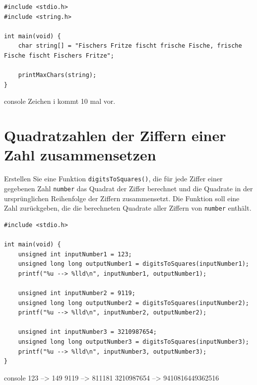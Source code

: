 \Vorlage
\begin{verbatim}
#include <stdio.h>
#include <string.h>

int main(void) {
    char string[] = "Fischers Fritze fischt frische Fische, frische Fische fischt Fischers Fritze";

    printMaxChars(string);
}
\end{verbatim}

\begin{mybox}[Bildschirmausgabe]{console}
Zeichen i kommt 10 mal vor.
\end{mybox}





\chapter{Quadratzahlen der Ziffern einer Zahl zusammensetzen}

\vspace{10pt}

Erstellen Sie eine Funktion \texttt{digitsToSquares()}, die für jede
Ziffer einer gegebenen Zahl \texttt{number} das Quadrat der Ziffer
berechnet und die Quadrate in der ursprünglichen Reihenfolge der Ziffern
zusammensetzt. Die Funktion soll eine Zahl zurückgeben, die die berechneten
Quadrate aller Ziffern von \texttt{number} enthält.

\Vorlage
\begin{verbatim}
#include <stdio.h>

int main(void) {
    unsigned int inputNumber1 = 123;
    unsigned long long outputNumber1 = digitsToSquares(inputNumber1);
    printf("%u --> %lld\n", inputNumber1, outputNumber1);

    unsigned int inputNumber2 = 9119;
    unsigned long long outputNumber2 = digitsToSquares(inputNumber2);
    printf("%u --> %lld\n", inputNumber2, outputNumber2);

    unsigned int inputNumber3 = 3210987654;
    unsigned long long outputNumber3 = digitsToSquares(inputNumber3);
    printf("%u --> %lld\n", inputNumber3, outputNumber3);
}
\end{verbatim}

\begin{mybox}[title=Bildschirmausgabe]{console}
123 --> 149
9119 --> 811181
3210987654 --> 9410816449362516
\end{mybox}





